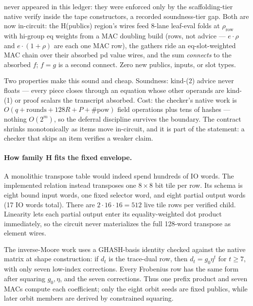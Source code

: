 \documentclass[11pt]{article}
\theoremstyle{definition}
\begin{document}
\begin{itemize}[nosep]
        never appeared in this ledger: they were enforced only by the
        scaffolding-tier native verify inside the tape constructors, a
        recorded soundness-tier gap. Both are now in-circuit: the
        H(publics) region's wires feed 8-lane leaf-eval folds at
        $\rho_{\mathrm{row}}$ with hi-group eq weights from a MAC
        doubling build (rows, not advice — $e \cdot \rho$ and
        $e \cdot (1{+}\rho)$ are each one MAC row), the gathers ride an
        eq-slot-weighted MAC chain over their absorbed pd value wires,
        and the sum \emph{connects} to the absorbed $f$; $f = g$ is a
        second connect. Zero new publics, inputs, or slot types.
\end{itemize}

Two properties make this sound and cheap. Soundness: kind-(2) advice
never floats — every piece closes through an equation whose other
operands are kind-(1) or proof scalars the transcript absorbed. Cost:
the checker's native work is $O(q + \text{rounds} + 128R + P +
\#\mathrm{pow})$ field operations plus tens of hashes — nothing
$O(2^m)$, so the deferral discipline survives the boundary. The
contract shrinks monotonically as items move in-circuit, and it is
part of the statement: a checker that skips an item verifies a weaker
claim.

\paragraph{How family H fits the fixed envelope.}
A monolithic transpose table would indeed spend hundreds of IO words. The
implemented relation instead transposes one $8\times8$ bit tile per row. Its
schema is eight bound input words, one fixed selector word, and eight partial
output words (17 IO words total). There are $2\cdot16\cdot16=512$ live tile
rows per verified child. Linearity lets each partial output enter its
equality-weighted dot product immediately, so the circuit never materializes
the full 128-word transpose as element wires.

The inverse-Moore work uses a GHASH-basis identity checked against the native
matrix at shape construction: if $d_t$ is the trace-dual row, then
$d_t=g_0\eta^t$ for $t\geq7$, with only seven low-index corrections. Every
Frobenius row has the same form after squaring $g_0,\eta$, and the seven
corrections. Thus one prefix product and seven MACs compute each coefficient;
only the eight orbit seeds are fixed publics, while later orbit members are
derived by constrained squaring.
\end{document}
